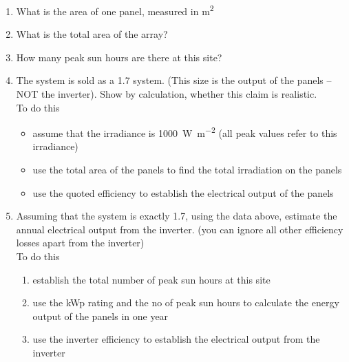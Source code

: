 \documentclass[crop=false,parskip=half]{scrartcl} %
\begin{document}
\begin{question}\label{qu:ex1}
\begin{enumerate} [label=\alph*)]
\item What is the area of one panel, measured in \si{\metre\squared}
\item What is the total area of the array?
\item How many peak sun hours are there at this site?
\item The system is sold as a \SI{1.7}{\kilowattpeak} system. (This size is the output of the panels – NOT the inverter). Show by calculation, whether this claim is realistic.\\ 
To do this
\begin{itemize}
\item assume that the irradiance is \SI{1000}{\watt\per\metre\squared}  (all peak values refer to this irradiance)
\item use the total area of the panels to find the total irradiation on the panels
\item use the quoted efficiency to establish the electrical output of the panels
\end{itemize}

\item Assuming that the system is exactly \SI{1.7}{\kilowattpeak}, using the data above, estimate the annual electrical output from the inverter.  (you can ignore all other efficiency losses apart from the inverter)\\
To do this
\begin{enumerate} [label=\roman*)]
\item establish the total number of peak sun hours at this site
\item use the kWp rating and the no of peak sun hours to calculate the energy output of the panels in one year
\item use the inverter efficiency to establish the electrical output from the inverter
\end{enumerate}


\end{enumerate}
\end{question}
\end{document}
